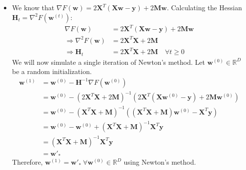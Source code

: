 \documentclass{article}
\newcommand{\mathbi}[1]{\boldsymbol{#1}}
\begin{document}
\begin{itemize}
\begin{itemize}
      \item[3.] We know that $\nabla F(\mathbi{w}) = 2 \mathbi{X}^T (\mathbi{X} \mathbi{w} - \mathbi{y}) + 2 \mathbi{M} \mathbi{w}$.
      Calculating the Hessian $\mathbi{H}_t = \nabla^2 F(\mathbi{w}^{(t)})$:
      \begin{align*}
        \nabla F(\mathbi{w}) &= 2 \mathbi{X}^T (\mathbi{X} \mathbi{w} - \mathbi{y}) + 2 \mathbi{M} \mathbi{w} \tag{From part 2} \\
        \Rightarrow \nabla^2 F(\mathbi{w}) &= 2 \mathbi{X}^T \mathbi{X} + 2 \mathbi{M} \\
        \Rightarrow \mathbi{H}_t &= 2 \mathbi{X}^T \mathbi{X} + 2 \mathbi{M} \quad \forall t \geq 0
      \end{align*}
      We will now simulate a single iteration of Newton's method.
      Let $\mathbi{w}^{(0)} \in \mathbb{R}^D$ be a random initialization.
      \begin{align*}
        \mathbi{w}^{(1)} &= \mathbi{w}^{(0)} - \mathbi{H}^{-1} \nabla F(\mathbi{w}^{(0)}) \\
        &= \mathbi{w}^{(0)} - (2 \mathbi{X}^T \mathbi{X} + 2 \mathbi{M})^{-1} (2 \mathbi{X}^T (\mathbi{X} \mathbi{w}^{(0)} - \mathbi{y}) + 2 \mathbi{M} \mathbi{w}^{(0)}) \\
        &= \mathbi{w}^{(0)} - (\mathbi{X}^T \mathbi{X} + \mathbi{M})^{-1} ((\mathbi{X}^T \mathbi{X} + \mathbi{M}) \mathbi{w}^{(0)} - \mathbi{X}^T \mathbi{y}) \\
        &= \mathbi{w}^{(0)} - \mathbi{w}^{(0)} + (\mathbi{X}^T \mathbi{X} + \mathbi{M})^{-1} \mathbi{X}^T \mathbi{y} \\
        &= (\mathbi{X}^T \mathbi{X} + \mathbi{M})^{-1} \mathbi{X}^T \mathbi{y} \\
        &= \mathbi{w}'_*
      \end{align*}
      Therefore, $\mathbi{w}^{(1)} = \mathbi{w}'_* ~ \forall \mathbi{w}^{(0)} \in \mathbb{R}^D$ using Newton's method.
    \end{itemize}


\end{itemize}
\end{document}
